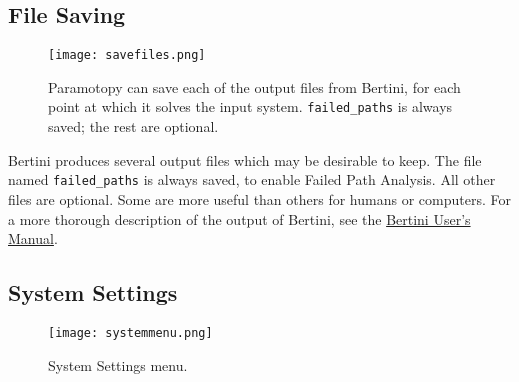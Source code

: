 \subsection{File Saving}


\begin{figure}[h]
\begin{center}
\texttt{[image: savefiles.png]}
\caption[File Saving]{Paramotopy can save each of the output files from Bertini, for each point at which it solves the input system.  \texttt{failed\_paths} is always saved; the rest are optional.}
\label{screen:savefilesmenu}
\end{center}
\end{figure}

Bertini produces several output files which may be desirable to keep.  The file named \texttt{failed\_paths} is always saved, to enable Failed Path Analysis.  All other files are optional.  Some are more useful than others for humans or computers.  For a more thorough description of the output of Bertini, see the \href{https://www.nd.edu/~sommese/bertini/BertiniUsersManual.pdf}{Bertini User's Manual}.







\subsection{System Settings}
\begin{figure}[h]
\begin{center}
\texttt{[image: systemmenu.png]}
\caption[General Settings Menu]{System Settings menu.}
\label{screen:systemmenu}
\end{center}
\end{figure}

